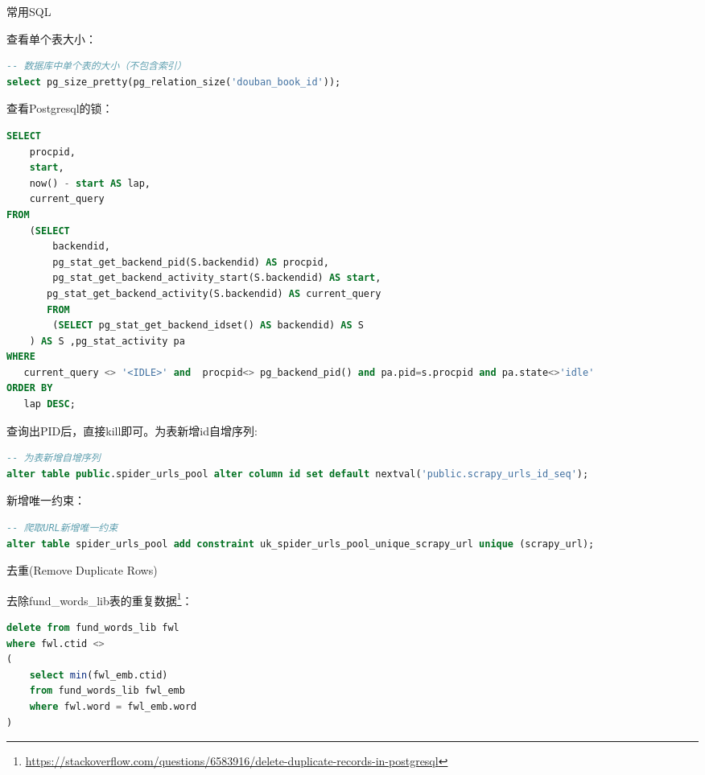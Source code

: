 \documentclass[8pt]{book}
\makeatletter
\numberwithin{dummy}{section}
\theoremstyle{ocrenumbox}
\theoremstyle{blacknumex}
\theoremstyle{blacknumbox}
\theoremstyle{ocrenum}
\renewcommand{\subsection}{\@startsection {subsection}{2}{\z@}
	{-3ex \@plus -0.1ex \@minus -.4ex}
	{0.5ex \@plus.2ex }
	{\normalfont\sffamily\bfseries}}
\renewcommand\paragraph{\@startsection{paragraph}{4}{\z@}
	{-2ex \@plus-.2ex \@minus .2ex}
	{.1ex}
	{\normalfont\small\sffamily\bfseries}}
\makeatother
\begin{document}
\subsection{常用SQL}

查看单个表大小：

\begin{lstlisting}[language=SQL]
-- 数据库中单个表的大小（不包含索引）
select pg_size_pretty(pg_relation_size('douban_book_id'));
\end{lstlisting}

查看Postgresql的锁：

\begin{lstlisting}[language=SQL]
SELECT   
    procpid,   
    start,   
    now() - start AS lap,   
    current_query   
FROM   
    (SELECT   
        backendid,   
        pg_stat_get_backend_pid(S.backendid) AS procpid,   
        pg_stat_get_backend_activity_start(S.backendid) AS start,   
       pg_stat_get_backend_activity(S.backendid) AS current_query   
       FROM   
        (SELECT pg_stat_get_backend_idset() AS backendid) AS S   
    ) AS S ,pg_stat_activity pa  
WHERE   
   current_query <> '<IDLE>' and  procpid<> pg_backend_pid() and pa.pid=s.procpid and pa.state<>'idle'  
ORDER BY   
   lap DESC;
\end{lstlisting}

查询出PID后，直接kill即可。为表新增id自增序列:

\begin{lstlisting}[language=SQL]
-- 为表新增自增序列
alter table public.spider_urls_pool alter column id set default nextval('public.scrapy_urls_id_seq');
\end{lstlisting}

新增唯一约束：

\begin{lstlisting}[language=SQL]
-- 爬取URL新增唯一约束
alter table spider_urls_pool add constraint uk_spider_urls_pool_unique_scrapy_url unique (scrapy_url);
\end{lstlisting}

\paragraph{去重(Remove Duplicate Rows)}

去除fund\_words\_lib表的重复数据\footnote{\url{https://stackoverflow.com/questions/6583916/delete-duplicate-records-in-postgresql}}：

\begin{lstlisting}[language=SQL]
delete from fund_words_lib fwl
where fwl.ctid <>
(
	select min(fwl_emb.ctid)
	from fund_words_lib fwl_emb
	where fwl.word = fwl_emb.word
)
\end{lstlisting}
\end{document}
